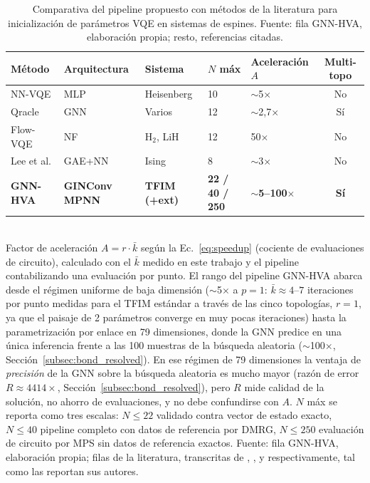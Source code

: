 \documentclass[11pt,a4paper,spanish]{book}
\begin{document}
\begin{table}[h]
\centering
\caption[Comparativa con métodos de la literatura]{Comparativa del pipeline propuesto con métodos de la literatura para inicialización de parámetros VQE en sistemas de espines. Fuente: fila GNN-HVA, elaboración propia; resto, referencias citadas.}
\label{tab:comparison_literature}
\small
\begin{tabular}{@{}p{2.4cm}p{1.9cm}p{1.9cm}p{1.9cm}p{2.3cm}c@{}}
\toprule
\textbf{Método} & \textbf{Arquitectura} & \textbf{Sistema} & \textbf{$N$ máx} & \textbf{Aceleración $A$} & \textbf{Multi-topo} \\
\midrule
NN-VQE \citep{miao2024} & MLP & Heisenberg & 10 & $\sim$5$\times$ & No \\
Qracle \citep{zhang2025} & GNN & Varios & 12 & $\sim$2,7$\times$ & Sí \\
Flow-VQE \citep{zou2026} & NF & H$_2$, LiH & 12 & 50$\times$ & No \\
Lee et al. \citep{lee2026} & GAE+NN & Ising & 8 & $\sim$3$\times$ & No \\
\midrule
\textbf{GNN-HVA} & \textbf{GINConv MPNN} & \textbf{TFIM (+ext)} & \textbf{22 / 40 / 250} & \textbf{$\sim$5--100$\times$} & \textbf{Sí} \\
\bottomrule
\end{tabular}
\\[2pt]
\footnotesize Factor de aceleración $A = r \cdot \bar{k}$ según la Ec.~\ref{eq:speedup} (cociente de evaluaciones de circuito), calculado con el $\bar{k}$ medido en este trabajo y el pipeline contabilizando una evaluación por punto. El rango del pipeline GNN-HVA abarca desde el régimen uniforme de baja dimensión ($\sim$5$\times$ a $p = 1$: $\bar{k} \approx 4$--$7$ iteraciones por punto medidas para el TFIM estándar a través de las cinco topologías, $r = 1$, ya que el paisaje de 2 parámetros converge en muy pocas iteraciones) hasta la parametrización por enlace en 79 dimensiones, donde la GNN predice en una única inferencia frente a las 100 muestras de la búsqueda aleatoria ($\sim$100$\times$, Sección~\ref{subsec:bond_resolved}). En ese régimen de 79 dimensiones la ventaja de \emph{precisión} de la GNN sobre la búsqueda aleatoria es mucho mayor (razón de error $R \approx 4414\times$, Sección~\ref{subsec:bond_resolved}), pero $R$ mide calidad de la solución, no ahorro de evaluaciones, y no debe confundirse con $A$. $N$ máx se reporta como tres escalas: $N \leq 22$ validado contra vector de estado exacto, $N \leq 40$ pipeline completo con datos de referencia por DMRG, $N \leq 250$ evaluación de circuito por MPS sin datos de referencia exactos. Fuente: fila GNN-HVA, elaboración propia; filas de la literatura, transcritas de \citet{miao2024}, \citet{zhang2025}, \citet{zou2026} y \citet{lee2026} respectivamente, tal como las reportan sus autores.
\end{table}
\end{document}

